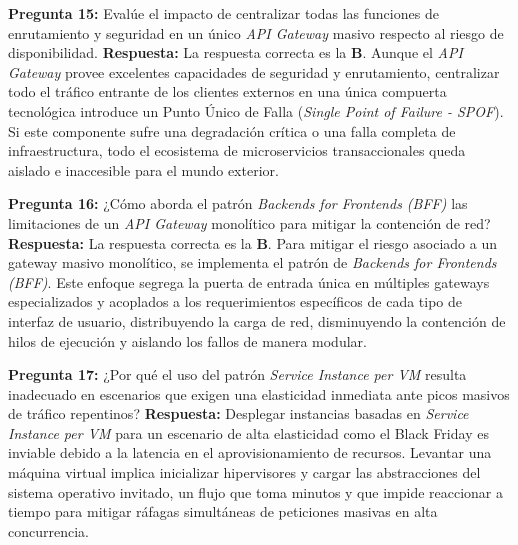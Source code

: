 \vspace{4mm}

\noindent\textbf{Pregunta 15:} Evalúe el impacto de centralizar todas las funciones de enrutamiento y seguridad en un único \textit{API Gateway} masivo respecto al riesgo de disponibilidad.
\newline
\textbf{Respuesta:} La respuesta correcta es la \textbf{B}. Aunque el \textit{API Gateway} provee excelentes capacidades de seguridad y enrutamiento, centralizar todo el tráfico entrante de los clientes externos en una única compuerta tecnológica introduce un Punto Único de Falla (\textit{Single Point of Failure - SPOF}). Si este componente sufre una degradación crítica o una falla completa de infraestructura, todo el ecosistema de microservicios transaccionales queda aislado e inaccesible para el mundo exterior.

\vspace{4mm}

\noindent\textbf{Pregunta 16:} ¿Cómo aborda el patrón \textit{Backends for Frontends (BFF)} las limitaciones de un \textit{API Gateway} monolítico para mitigar la contención de red?
\newline
\textbf{Respuesta:} La respuesta correcta es la \textbf{B}. Para mitigar el riesgo asociado a un gateway masivo monolítico, se implementa el patrón de \textit{Backends for Frontends (BFF)}. Este enfoque segrega la puerta de entrada única en múltiples gateways especializados y acoplados a los requerimientos específicos de cada tipo de interfaz de usuario, distribuyendo la carga de red, disminuyendo la contención de hilos de ejecución y aislando los fallos de manera modular.

\vspace{4mm}

\noindent\textbf{Pregunta 17:} ¿Por qué el uso del patrón \textit{Service Instance per VM} resulta inadecuado en escenarios que exigen una elasticidad inmediata ante picos masivos de tráfico repentinos?
\newline
\textbf{Respuesta:} Desplegar instancias basadas en \textit{Service Instance per VM} para un escenario de alta elasticidad como el Black Friday es inviable debido a la latencia en el aprovisionamiento de recursos. Levantar una máquina virtual implica inicializar hipervisores y cargar las abstracciones del sistema operativo invitado, un flujo que toma minutos y que impide reaccionar a tiempo para mitigar ráfagas simultáneas de peticiones masivas en alta concurrencia.

\vspace{4mm}

